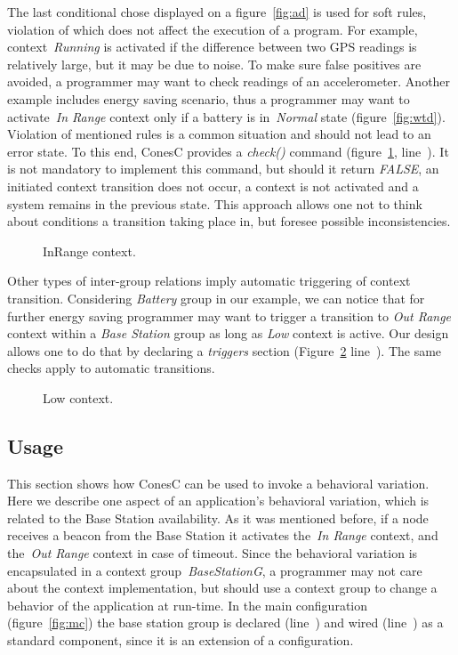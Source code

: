 The last conditional chose displayed on a figure~\ref{fig:ad} is used for soft rules, violation of
which does not affect the execution of a program. For example, context~\emph{Running} is
activated if the difference between two GPS readings is relatively large, but it may be due to noise.
To make sure false positives are avoided, a programmer may want to check
readings of an accelerometer. Another example includes energy saving scenario,
thus a programmer may want to activate~\emph{In Range} context only if a battery is
in~\emph{Normal} state (figure~\ref{fig:wtd}).
Violation of mentioned rules is a common situation and should not lead to an error state.
To this end, ConesC provides a \emph{check()} command
(figure~\ref{fig:irc}, line~). It is not mandatory to implement this command, but
should it return \emph{FALSE}, an initiated context transition does not occur,
a context is not activated and a system remains in the previous state.
This approach allows one not to think about conditions a transition taking
place in, but foresee possible inconsistencies.


\begin{figure}[!h]
\TheSbox
\caption{InRange context.}
\label{fig:irc}
\end{figure}

Other types of inter-group relations imply automatic triggering of context
transition. Considering \emph{Battery} group in our example, we can notice that
for further energy saving programmer may want to trigger a transition to
\emph{Out Range} context within a \emph{Base Station} group as long as
\emph{Low} context is active. Our design allows one to do that by declaring a
\emph{triggers} section (Figure~\ref{fig:lc} line~). The same checks apply to
automatic transitions.


\begin{figure}[!h]
\TheSbox
\caption{Low context.}
\label{fig:lc}
\end{figure}

\subsection{Usage}

This section shows how ConesC can be used to invoke a behavioral
variation. Here we describe one aspect of an application's behavioral variation,
which is related to the Base Station availability. As it was mentioned before,
if a node receives a beacon from the Base Station it activates the~\emph{In Range}
context, and the~\emph{Out Range} context in case of timeout.
Since the behavioral variation is encapsulated in a context group~\emph{BaseStationG},
a programmer may not care about the context implementation, but should use a context group
to change a behavior of the application at run-time. In the main
configuration (figure~\ref{fig:mc}) the base station group is declared
(line~) and wired (line~) as a standard
component, since it is an extension of a configuration.

